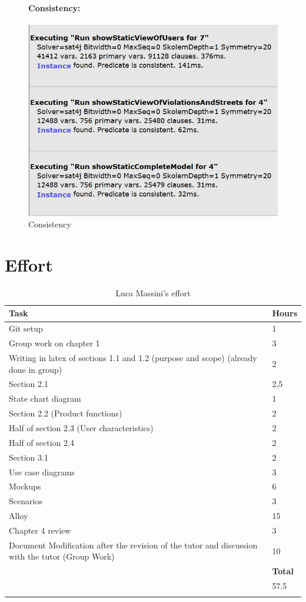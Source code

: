 \documentclass[titlepage]{article}
\begin{document}
\begin{figure}[h]
	\paragraph{Consistency:}
	\includegraphics[scale=1.168]{Alloy images/Consistency of the model.png}
	\centering
	\caption{Consistency}
\end{figure}
\FloatBarrier
\newpage
\section{Effort}
\begin{longtable}{| p{12 cm} | p{2 cm} |} 
		\hline
		{\bf Task} & {\bf Hours}\\
		\hline
		 Git setup & 1 \\
		 Group work on chapter 1 & 3 \\
		 Writing in latex of sections 1.1 and 1.2 (purpose and scope) (already done in group) & 2 \\
		 Section 2.1 & 2,5 \\
		 State chart diagram & 1 \\
		 Section 2.2 (Product functions) & 2 \\
		 Half of section 2.3 (User characteristics) & 2 \\
		 Half of section 2.4 & 2 \\
		 Section 3.1 & 2\\
		 Use case diagrams & 3 \\
		 Mockups & 6\\
		 Scenarios & 3 \\
		 Alloy & 15\\
		 Chapter 4 review & 3\\
		 
		 Document Modification after the revision of the
		 tutor and discussion with the tutor (Group Work) & 10 \\
		\hline
		&  {\bf Total} \\
		\hline
		&  57.5 \\
		\hline
		\caption{Luca Massini's effort}
	\end{longtable}
	
\end{document}
